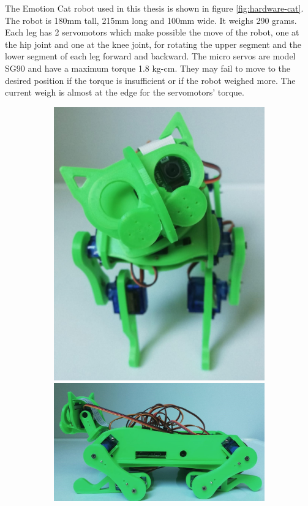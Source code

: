 \documentclass[runningheads,a4paper,12pt]{report}
\begin{document}
The Emotion Cat robot used in this thesis is shown in figure \ref{fig:hardware-cat}. The robot is 180mm tall, 215mm long and 100mm wide. It weighs 290 grams. Each leg has 2 servomotors which make possible the move of the robot, one at the hip joint and one at the knee joint, for rotating the upper segment and the lower segment of each leg forward and backward. The micro servos are model SG90 and have a maximum torque 1.8 kg-cm. They may fail to move to the desired position if the torque is insufficient or if the robot weighed more. The current weigh is almost at the edge for the servomotors' torque.

\begin{figure}
	\centering

  \begin{subfigure}{\linewidth}
  \includegraphics[width=.35\linewidth]{./images/cat_up}\hfill
  \includegraphics[width=.60\linewidth]{./images/cat_from_lateral}
  \end{subfigure}\par\medskip
  

\end{figure}
\end{document}
